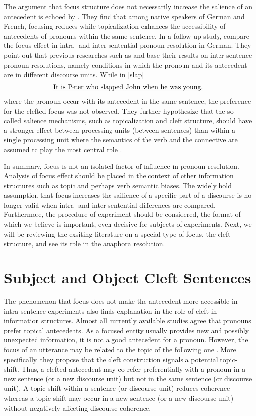 The argument that focus structure does not necessarily increase the salience of an antecedent is echoed by \citet{colonna2012}. They find that among native speakers of German and French, focusing reduces while topicalization enhances the accessibility of antecedents of pronouns within the same sentence. In a follow-up study, \citet{colonna2015} compare the focus effect in intra- and inter-sentential pronoun resolution in German. They point out that previous researches such as \citet{kaiser2011} and \citet{cowles2007} base their results on inter-sentence pronoun resolutions, namely conditions in which the pronoun and its antecedent are in different discourse units. While in \eqref{slap} 
\begin{align}
	\mbox{\emph{It is Peter who slapped John when he was young.}}\label{slap}
\end{align}
where the pronoun occur with its antecedent in the same sentence, the preference for the clefted focus was not observed. They further hypothesize that the so-called salience mechanisms, such as topicalization and cleft structure, should have a stronger effect between processing units (between sentences) than within a single processing unit where the semantics of the verb and the connective are assumed to play the most central role \citep{grosz1995}. 

In summary, focus is not an isolated factor of influence in pronoun resolution. Analysis of focus effect should be placed in the context of other information structures such as topic and perhaps verb semantic biases. The widely hold assumption that focus increases the sailience of a specific part of a discourse is no longer valid when intra- and inter-sentential differences are compared. Furthermore, the procedure of experiment should be considered, the format of which we believe is important, even decisive for subjects of experiments. Next, we will be reviewing the exsiting literature on a special type of focus, the cleft structure, and see its role in the anaphora resolution.

\section{Subject and Object Cleft Sentences}
The phenomenon that focus does not make the antecedent more accessible in intra-sentence experiments also finds explanation in the role of cleft in information structures. Almost all currently available studies agree that pronouns prefer topical antecedents. As a focused entity usually provides new and possibly unexpected information, it is not a good antecedent for a pronoun. However, the focus of an utterance may be related to the topic of the following one \citep{sgall1986}. More specifically, they propose that the cleft construction signals a potential topic-shift. Thus, a clefted antecedent may co-refer preferentially with a pronoun in a new sentence (or a new discourse unit) but not in the same sentence (or discourse unit). A topic-shift within a sentence (or discourse unit) reduces coherence whereas a topic-shift may occur in a new sentence (or a new discourse unit) without negatively affecting discourse coherence. 

